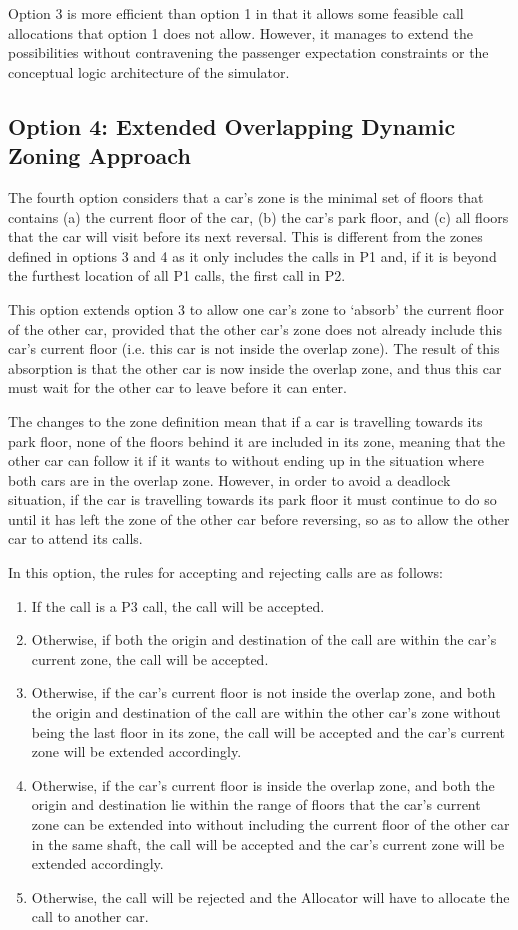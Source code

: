 \documentclass{UoYCSproject}
\begin{document}
Option 3 is more efficient than option 1 in that it allows some feasible call allocations that option 1 does not allow.  However, it manages to extend the possibilities without contravening the passenger expectation constraints or the conceptual logic architecture of the simulator.

\subsection{Option 4: Extended Overlapping Dynamic Zoning Approach}

The fourth option considers that a car's zone is the minimal set of floors that contains (a) the current floor of the car, (b) the car's park floor, and (c) all floors that the car will visit before its next reversal.  This is different from the zones defined in options 3 and 4 as it only includes the calls in P1 and, if it is beyond the furthest location of all P1 calls, the first call in P2.

This option extends option 3 to allow one car's zone to `absorb' the current floor of the other car, provided that the other car's zone does not already include this car's current floor (i.e. this car is not inside the overlap zone).  The result of this absorption is that the other car is now inside the overlap zone, and thus this car must wait for the other car to leave before it can enter.

The changes to the zone definition mean that if a car is travelling towards its park floor, none of the floors behind it are included in its zone, meaning that the other car can follow it if it wants to without ending up in the situation where both cars are in the overlap zone.  However, in order to avoid a deadlock situation, if the car is travelling towards its park floor it must continue to do so until it has left the zone of the other car before reversing, so as to allow the other car to attend its calls.

In this option, the rules for accepting and rejecting calls are as follows:
	\begin{enumerate}
		\item If the call is a P3 call, the call will be accepted.
		\item Otherwise, if both the origin and destination of the call are within the car's current zone, the call will be accepted.
		\item Otherwise, if the car's current floor is not inside the overlap zone, and both the origin and destination of the call are within the other car's zone without being the last floor in its zone, the call will be accepted and the car's current zone will be extended accordingly.
		\item Otherwise, if the car's current floor is inside the overlap zone, and both the origin and destination lie within the range of floors that the car's current zone can be extended into without including the current floor of the other car in the same shaft, the call will be accepted and the car's current zone will be extended accordingly.
		\item Otherwise, the call will be rejected and the Allocator will have to allocate the call to another car.
	\end{enumerate}
\end{document}
